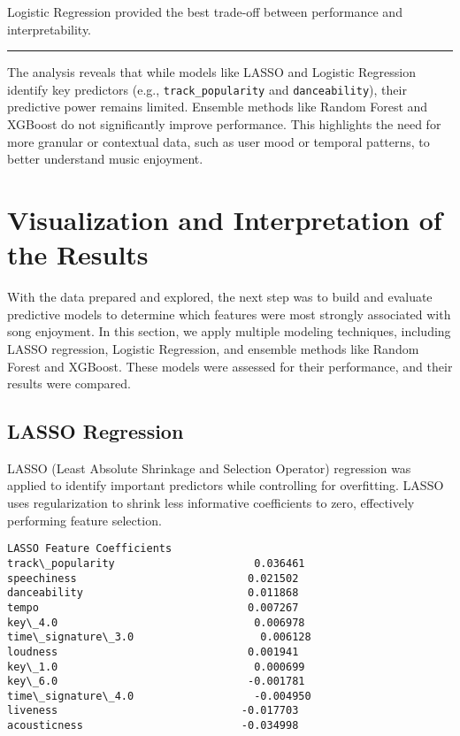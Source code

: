 \documentclass[11pt]{article}
\begin{document}
Logistic Regression provided the best trade-off between performance and
interpretability.

\begin{center}\rule{0.5\linewidth}{0.5pt}\end{center}

The analysis reveals that while models like LASSO and Logistic
Regression identify key predictors (e.g., \texttt{track\_popularity} and
\texttt{danceability}), their predictive power remains limited. Ensemble
methods like Random Forest and XGBoost do not significantly improve
performance. This highlights the need for more granular or contextual
data, such as user mood or temporal patterns, to better understand music
enjoyment.

    \section{Visualization and Interpretation of the
Results}\label{visualization-and-interpretation-of-the-results}

    With the data prepared and explored, the next step was to build and
evaluate predictive models to determine which features were most
strongly associated with song enjoyment. In this section, we apply
multiple modeling techniques, including LASSO regression, Logistic
Regression, and ensemble methods like Random Forest and XGBoost. These
models were assessed for their performance, and their results were
compared.

\subsection{LASSO Regression}\label{lasso-regression}

LASSO (Least Absolute Shrinkage and Selection Operator) regression was
applied to identify important predictors while controlling for
overfitting. LASSO uses regularization to shrink less informative
coefficients to zero, effectively performing feature selection.

    
    \begin{Verbatim}[commandchars=\\\{\}]
                    LASSO Feature Coefficients
track\_popularity                      0.036461
speechiness                           0.021502
danceability                          0.011868
tempo                                 0.007267
key\_4.0                               0.006978
time\_signature\_3.0                    0.006128
loudness                              0.001941
key\_1.0                               0.000699
key\_6.0                              -0.001781
time\_signature\_4.0                   -0.004950
liveness                             -0.017703
acousticness                         -0.034998
    \end{Verbatim}
\end{document}
